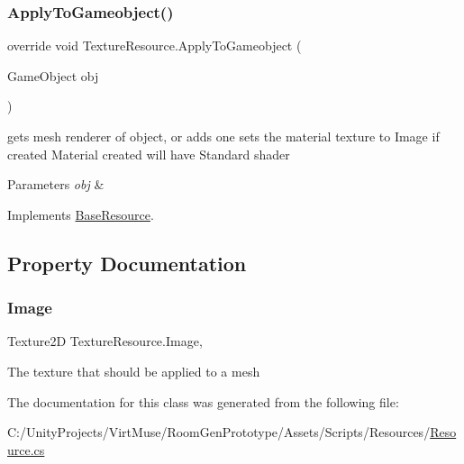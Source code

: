 \subsubsection{\texorpdfstring{Apply\+To\+Gameobject()}{ApplyToGameobject()}}
{\footnotesize\ttfamily override void Texture\+Resource.\+Apply\+To\+Gameobject (\begin{DoxyParamCaption}\item[{Game\+Object}]{obj }\end{DoxyParamCaption})\hspace{0.3cm}{\ttfamily [virtual]}}



gets mesh renderer of object, or adds one sets the material texture to Image if created Material created will have Standard shader 


\begin{DoxyParams}{Parameters}
{\em obj} & \\
\hline
\end{DoxyParams}


Implements \mbox{\hyperlink{class_base_resource_a2d832c8042114da9e3f6240651d59703}{Base\+Resource}}.



\subsection{Property Documentation}
\mbox{\label{class_texture_resource_a0b9a7b94d4b0ace91e08d02a0b785c2e}} 
\subsubsection{\texorpdfstring{Image}{Image}}
{\footnotesize\ttfamily Texture2D Texture\+Resource.\+Image\hspace{0.3cm}{\ttfamily [get]}, {\ttfamily [set]}}



The texture that should be applied to a mesh 



The documentation for this class was generated from the following file\+:\begin{DoxyCompactItemize}
\item 
C\+:/\+Unity\+Projects/\+Virt\+Muse/\+Room\+Gen\+Prototype/\+Assets/\+Scripts/\+Resources/\mbox{\hyperlink{_resource_8cs}{Resource.\+cs}}\end{DoxyCompactItemize}
